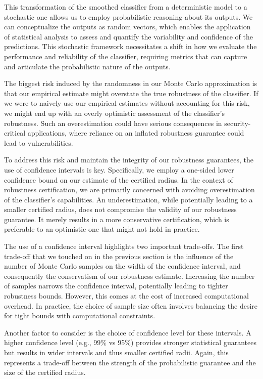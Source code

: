 This transformation of the smoothed classifier from a deterministic model to a stochastic one allows us to employ probabilistic reasoning about its outputs.
We can conceptualize the outputs as random vectors, which enables the application of statistical analysis to assess and quantify the variability and confidence of the predictions.
This stochastic framework necessitates a shift in how we evaluate the performance and reliability of the classifier, requiring metrics that can capture and articulate the probabilistic nature of the outputs.

The biggest risk induced by the randomness in our Monte Carlo approximation is that our empirical estimate might overstate the true robustness of the classifier.
If we were to naively use our empirical estimates without accounting for this risk, we might end up with an overly optimistic assessment of the classifier's robustness.
Such an overestimation could have serious consequences in security-critical applications, where reliance on an inflated robustness guarantee could lead to vulnerabilities.

To address this risk and maintain the integrity of our robustness guarantees, the use of confidence intervals is key.
Specifically, we employ a one-sided lower confidence bound on our estimate of the certified radius.
In the context of robustness certification, we are primarily concerned with avoiding overestimation of the classifier's capabilities.
An underestimation, while potentially leading to a smaller certified radius, does not compromise the validity of our robustness guarantee.
It merely results in a more conservative certification, which is preferable to an optimistic one that might not hold in practice.

The use of a confidence interval highlights two important trade-offs.
The first trade-off that we touched on in the previous section is the influence of the number of Monte Carlo samples on the width of the confidence interval, and consequently the conservatism of our robustness estimate.
Increasing the number of samples narrows the confidence interval, potentially leading to tighter robustness bounds.
However, this comes at the cost of increased computational overhead.
In practice, the choice of sample size often involves balancing the desire for tight bounds with computational constraints.

Another factor to consider is the choice of confidence level for these intervals.
A higher confidence level (e.g., 99\% vs 95\%) provides stronger statistical guarantees but results in wider intervals and thus smaller certified radii.
Again, this represents a trade-off between the strength of the probabilistic guarantee and the size of the certified radius.

